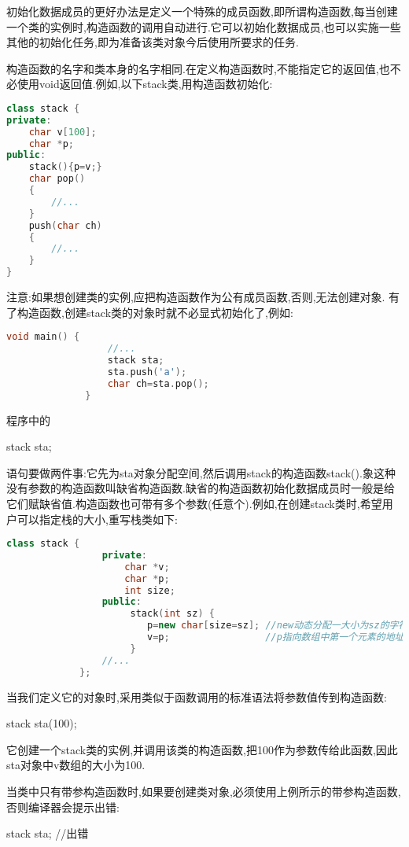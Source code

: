 \documentclass{article}
\begin{document}
初始化数据成员的更好办法是定义一个特殊的成员函数,即所谓构造函数,每当创建一个类的实例时,构造函数的调用自动进行.它可以初始化数据成员,也可以实施一些其他的初始化任务,即为准备该类对象今后使用所要求的任务.

构造函数的名字和类本身的名字相同.在定义构造函数时,不能指定它的返回值,也不必使用void返回值.例如,以下stack类,用构造函数初始化:
\begin{lstlisting}[language=c++]
class stack {
private:
    char v[100];
    char *p;
public:
    stack(){p=v;}
    char pop()
    {
        //...
    }
    push(char ch)
    {
        //...
    }
}
\end{lstlisting}

注意:如果想创建类的实例,应把构造函数作为公有成员函数,否则,无法创建对象.
    有了构造函数,创建stack类的对象时就不必显式初始化了,例如:
\begin{lstlisting}[language=c++]
             void main() {             
                  //...
                  stack sta;
                  sta.push('a');
                  char ch=sta.pop();
              }
\end{lstlisting}
程序中的

stack sta;

语句要做两件事:它先为sta对象分配空间,然后调用stack的构造函数stack().象这种没有参数的构造函数叫缺省构造函数.缺省的构造函数初始化数据成员时一般是给它们赋缺省值.构造函数也可带有多个参数(任意个).例如,在创建stack类时,希望用户可以指定栈的大小,重写栈类如下:
\begin{lstlisting}[language=c++]
             class stack {                   
                 private:
                     char *v;
                     char *p;
                     int size;
                 public:
                      stack(int sz) {                     
                         p=new char[size=sz]; //new动态分配一大小为sz的字符数组,
                         v=p;                 //p指向数组中第一个元素的地址
                      }
                 //...
             };
\end{lstlisting}
当我们定义它的对象时,采用类似于函数调用的标准语法将参数值传到构造函数:

stack sta(100);

它创建一个stack类的实例,并调用该类的构造函数,把100作为参数传给此函数,因此sta对象中v数组的大小为100.

当类中只有带参构造函数时,如果要创建类对象,必须使用上例所示的带参构造函数,否则编译器会提示出错:

stack sta; //出错
\end{document}
